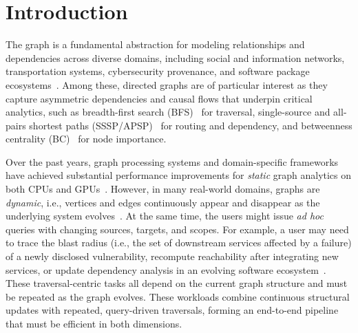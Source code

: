 \section{Introduction}
\label{sec:introduction}

The graph is a fundamental abstraction for modeling relationships and 
dependencies across diverse domains, including social and information 
networks, transportation systems, cybersecurity provenance, and software 
package ecosystems~\cite{mislove2007measurement, leskovec2005graphs, 
kikas2017structure}. 
Among these, directed graphs 
are of particular interest 
as they capture asymmetric dependencies and causal flows that 
underpin critical analytics, such as breadth-first search (BFS)~\cite{lee1961algorithm}
for traversal, single-source and all-pairs shortest paths (SSSP/APSP)~\cite{thorup1997undirected, seidel1992all}  for routing and dependency, and betweenness 
centrality (BC)~\cite{Brandes2001BC} for node importance.


Over the past years, graph processing systems and domain-specific 
frameworks have achieved substantial performance improvements for 
\emph{static} graph analytics on both CPUs and 
GPUs~\cite{Shun2013Ligra,Wang2016Gunrock,Zhang2018GraphIt}. 
However, in many real-world domains, graphs are \emph{dynamic}, i.e., vertices and edges
continuously appear and disappear as the underlying system evolves~\cite{besta2021practice}. At the
same time, the users might issue \emph{ad hoc} queries with changing sources,
targets, and scopes. For example, a user may need to trace the blast
radius (i.e., the set of downstream services affected by a failure) of a newly
disclosed vulnerability, recompute reachability after
integrating new services, or update dependency analysis in an evolving
software ecosystem~\cite{brank2003download}. These traversal-centric tasks all
depend on the current graph structure and must be repeated as the graph evolves. These 
workloads combine continuous structural updates with repeated, query-driven 
traversals, forming an end-to-end pipeline that must be efficient in both 
dimensions.

